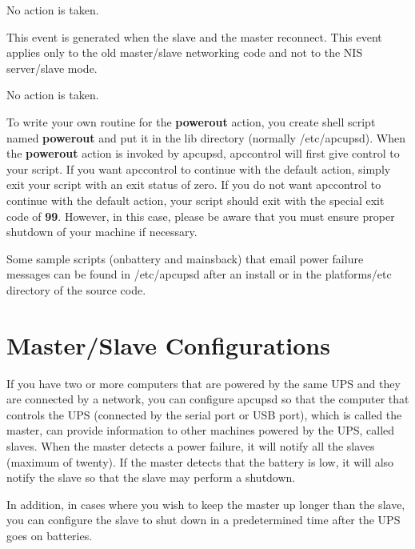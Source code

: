 {{{{{{\begin{description}
No action is taken.  

\item [masterconnect]
   This event is generated when the slave and the master reconnect. This event
applies only to the old master/slave networking code and not to the NIS
server/slave mode.  

No action is taken. 
\end{description}

To write your own routine for the {\bf powerout} action, you create shell
script named {\bf powerout} and put it in the lib directory (normally
/etc/apcupsd).  When the {\bf powerout} action is invoked by apcupsd,
apccontrol will first give control to your script.  If you want apccontrol to
continue with the default action, simply exit your script with an exit status
of zero.  If you do not want apccontrol to continue with the default action,
your script should exit with the special exit code of {\bf 99}.  However, in
this case, please be aware that you must ensure proper shutdown of your
machine if necessary.  

Some sample scripts (onbattery and mainsback) that email power failure
messages can be found in /etc/apcupsd after an install or in the
platforms/etc directory of the source code.

\label{Master_002fSlave-Configurations}

\section*{Master/Slave Configurations}

\label{index-Master_002fSlave-152}
If you have two or more computers that are powered by the same UPS and they
are connected by a network, you can configure apcupsd so that the computer
that controls the UPS (connected by the serial port or USB port), which is
called the master, can provide information to other machines powered by the
UPS, called slaves. When the master detects a power failure, it will notify
all the slaves (maximum of twenty). If the master detects that the battery is
low, it will also notify the slave so that the slave may perform a shutdown.  

In addition, in cases where you wish to keep the master up longer than the
slave, you can configure the slave to shut down in a predetermined time after
the UPS goes on batteries.  

}}}}}}
